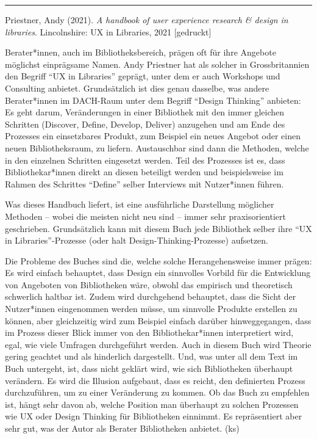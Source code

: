 \documentclass[a4paper,
fontsize=11pt,
oneside,
numbers=noperiodatend,
parskip=half-,
bibliography=totoc,
final
]{scrartcl}
\begin{document}
\begin{center}\rule{0.5\linewidth}{0.5pt}\end{center}

Priestner, Andy (2021). \emph{A handbook of user experience research \&
design in libraries}. Lincolnshire: UX in Libraries, 2021 {[}gedruckt{]}

Berater*innen, auch im Bibliotheksbereich, prägen oft für ihre Angebote
möglichst einprägsame Namen. Andy Priestner hat als solcher in
Grossbritannien den Begriff \enquote{UX in Libraries} geprägt, unter dem
er auch Workshops und Consulting anbietet. Grundsätzlich ist dies genau
dasselbe, was andere Berater*innen im DACH-Raum unter dem Begriff
\enquote{Design Thinking} anbieten: Es geht darum, Veränderungen in
einer Bibliothek mit den immer gleichen Schritten (Discover, Define,
Develop, Deliver) anzugehen und am Ende des Prozesses ein einsetzbares
Produkt, zum Beispiel ein neues Angebot oder einen neuen
Bibliotheksraum, zu liefern. Austauschbar sind dann die Methoden, welche
in den einzelnen Schritten eingesetzt werden. Teil des Prozesses ist es,
dass Bibliothekar*innen direkt an diesen beteiligt werden und
beispielsweise im Rahmen des Schrittes \enquote{Define} selber
Interviews mit Nutzer*innen führen.

Was dieses Handbuch liefert, ist eine ausführliche Darstellung möglicher
Methoden -- wobei die meisten nicht neu sind -- immer sehr
praxisorientiert geschrieben. Grundsätzlich kann mit diesem Buch jede
Bibliothek selber ihre \enquote{UX in Libraries}-Prozesse (oder halt
Design-Thinking-Prozesse) aufsetzen.

Die Probleme des Buches sind die, welche solche Herangehensweise immer
prägen: Es wird einfach behauptet, dass Design ein sinnvolles Vorbild
für die Entwicklung von Angeboten von Bibliotheken wäre, obwohl das
empirisch und theoretisch schwerlich haltbar ist. Zudem wird durchgehend
behauptet, dass die Sicht der Nutzer*innen eingenommen werden müsse, um
sinnvolle Produkte erstellen zu können, aber gleichzeitig wird zum
Beispiel einfach darüber hinweggegangen, dass im Prozess dieser Blick
immer von den Bibliothekar*innen interpretiert wird, egal, wie viele
Umfragen durchgeführt werden. Auch in diesem Buch wird Theorie gering
geachtet und als hinderlich dargestellt. Und, was unter all dem Text im
Buch untergeht, ist, dass nicht geklärt wird, wie sich Bibliotheken
überhaupt verändern. Es wird die Illusion aufgebaut, dass es reicht, den
definierten Prozess durchzuführen, um zu einer Veränderung zu kommen. Ob
das Buch zu empfehlen ist, hängt sehr davon ab, welche Position man
überhaupt zu solchen Prozessen wie UX oder Design Thinking für
Bibliotheken einnimmt. Es repräsentiert aber sehr gut, was der Autor als
Berater Bibliotheken anbietet. (ks)
\end{document}

